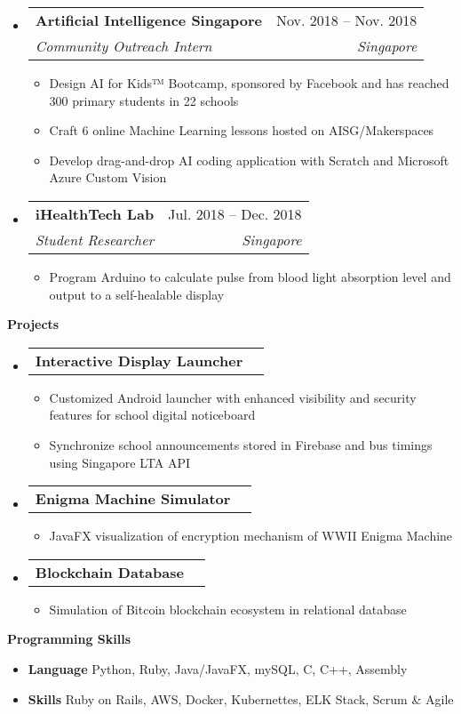 \documentclass[letterpaper,12pt]{article}[leftmargin=*]
\makeatletter
\def \entryspacing {-0pt}
\renewcommand{\section}[2]{\vspace{5pt}
  \colorbox{secondary}{\color{white}\raggedbottom\normalsize\textbf{{#1}{\hspace{7pt}#2}}}
}
\newcommand{\resumeEntryStart}{\begin{itemize}[leftmargin=2.5mm]}
\newcommand{\resumeEntryEnd}{\end{itemize}\vspace{\entryspacing}}
\newcommand{\resumeItemListStart}{\begin{itemize}[leftmargin=4.5mm]}
\newcommand{\resumeItemListEnd}{\end{itemize}}
\newcommand{\resumeItem}[1]{
  \item\small{
    {#1 \vspace{-2pt}}
  }
}
\newcommand{\resumeEntryTSDL}[4]{
  \vspace{-1pt}\item[]
    \begin{tabularx}{0.97\textwidth}{X@{\hspace{60pt}}r}
      \textbf{\color{primary}#1} & {\firabook\color{accent}\small#2} \\
      \textit{\color{accent}\small#3} & \textit{\color{accent}\small#4} \\
    \end{tabularx}\vspace{-6pt}
}
\newcommand{\resumeEntryTD}[2]{
  \vspace{-1pt}\item[]
    \begin{tabularx}{0.97\textwidth}{X@{\hspace{60pt}}r}
      \textbf{\color{primary}#1} & {\firabook\color{accent}\small#2} \\
    \end{tabularx}\vspace{-6pt}
}
\newcommand{\resumeEntryS}[2]{
  \item[]\small{
    \textbf{\color{primary}#1 }{ #2 \vspace{-6pt}}
  }
}
\makeatother
\begin{document}
  \resumeEntryStart
    \resumeEntryTSDL
      {Artificial Intelligence Singapore}{Nov. 2018 -- Nov. 2018}
      {Community Outreach Intern}{Singapore}
    \resumeItemListStart
      \resumeItem {Design AI for Kids™ Bootcamp, sponsored by Facebook and has reached 300 primary students in 22 schools}
      \resumeItem {Craft 6 online Machine Learning lessons hosted on AISG/Makerspaces}
      \resumeItem {Develop drag-and-drop AI coding application with Scratch and Microsoft Azure Custom Vision}
    \resumeItemListEnd
  \resumeEntryEnd
  
  \resumeEntryStart
    \resumeEntryTSDL
      {iHealthTech Lab}{Jul. 2018 -- Dec. 2018}
      {Student Researcher}{Singapore}
    \resumeItemListStart
      \resumeItem {Program Arduino to calculate pulse from blood light absorption level and output to a self-healable display}
    \resumeItemListEnd
  \resumeEntryEnd

\section{\faFlask}{Projects}

  \resumeEntryStart
    \resumeEntryTD
      {Interactive Display Launcher}{}
    \resumeItemListStart
      \resumeItem {Customized Android launcher with enhanced visibility and security features for school digital noticeboard}
      \resumeItem {Synchronize school announcements stored in Firebase and bus timings using Singapore LTA API}
    \resumeItemListEnd
  \resumeEntryEnd
  
  \resumeEntryStart
    \resumeEntryTD
      {Enigma Machine Simulator}{}
    \resumeItemListStart
      \resumeItem {JavaFX visualization of encryption mechanism of WWII Enigma Machine}
    \resumeItemListEnd
  \resumeEntryEnd

  \resumeEntryStart
    \resumeEntryTD
      {Blockchain Database}{}
    \resumeItemListStart
      \resumeItem {Simulation of Bitcoin blockchain ecosystem in relational database}
    \resumeItemListEnd
  \resumeEntryEnd

\section{\faGears}{Programming Skills}
 \resumeEntryStart
  \resumeEntryS{Language } {Python, Ruby, Java/JavaFX, mySQL, C, C++, Assembly}
  \resumeEntryS{Skills } {Ruby on Rails, AWS, Docker, Kubernettes, ELK Stack, Scrum \& Agile}
 \resumeEntryEnd
\end{document}
